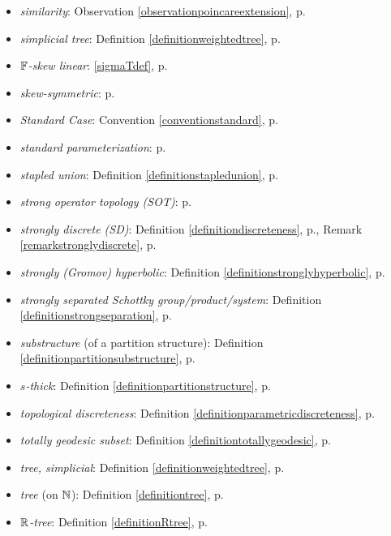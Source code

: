\begin{itemize}
\item\emph{similarity}: Observation \ref{observationpoincareextension}, p.\pageref{observationpoincareextension}
\item\emph{simplicial tree}: Definition \ref{definitionweightedtree}, p.\pageref{definitionweightedtree}
\item\emph{$\F$-skew linear}: \eqref{sigmaTdef}, p.\pageref{sigmaTdef}
\item\emph{skew-symmetric}: p.\pageref{subsectionROSSONCT}
\item\emph{Standard Case}: Convention \ref{conventionstandard}, p.\pageref{conventionstandard}
\item\emph{standard parameterization}: p.\pageref{lemmageodesicconvergence}
\item\emph{stapled union}: Definition \ref{definitionstapledunion}, p.\pageref{definitionstapledunion}
\item\emph{strong operator topology (SOT)}: p.\pageref{subsectiontopologies}
\item\emph{strongly discrete (SD)}: Definition \ref{definitiondiscreteness}, p.\pageref{definitiondiscreteness}, Remark \ref{remarkstronglydiscrete}, p.\pageref{remarkstronglydiscrete}
\item\emph{strongly (Gromov) hyperbolic}: Definition \ref{definitionstronglyhyperbolic}, p.\pageref{definitionstronglyhyperbolic}
\item\emph{strongly separated Schottky group/product/system}: Definition \ref{definitionstrongseparation}, p.\pageref{definitionstrongseparation}
\item\emph{substructure} (of a partition structure): Definition \ref{definitionpartitionsubstructure}, p.\pageref{definitionpartitionsubstructure}
\item\emph{$s$-thick}: Definition \ref{definitionpartitionstructure}, p.\pageref{definitionpartitionstructure}
\item\emph{topological discreteness}: Definition \ref{definitionparametricdiscreteness}, p.\pageref{definitionparametricdiscreteness}
\item\emph{totally geodesic subset}: Definition \ref{definitiontotallygeodesic}, p.\pageref{definitiontotallygeodesic}
\item\emph{tree, simplicial}: Definition \ref{definitionweightedtree}, p.\pageref{definitionweightedtree}
\item\emph{tree} (on $\N$): Definition \ref{definitiontree}, p.\pageref{definitiontree}
\item\emph{$\R$-tree}: Definition \ref{definitionRtree}, p.\pageref{definitionRtree}

\end{itemize}
